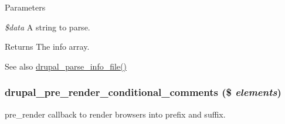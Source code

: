 \begin{DoxyParams}{Parameters}
\item[{\em \$data}]A string to parse.\end{DoxyParams}
\begin{DoxyReturn}{Returns}
The info array.
\end{DoxyReturn}
\begin{DoxySeeAlso}{See also}
\hyperlink{common_8inc_a277955232059631211fcfde533ea89d6}{drupal\_\-parse\_\-info\_\-file()} 
\end{DoxySeeAlso}
\hypertarget{common_8inc_a796bc999f4924685425e38cfb0a916ef}{
\subsubsection[{drupal\_\-pre\_\-render\_\-conditional\_\-comments}]{\setlength{\rightskip}{0pt plus 5cm}drupal\_\-pre\_\-render\_\-conditional\_\-comments (\$ {\em elements})}}
\label{common_8inc_a796bc999f4924685425e38cfb0a916ef}
pre\_\-render callback to render browsers into prefix and suffix.


